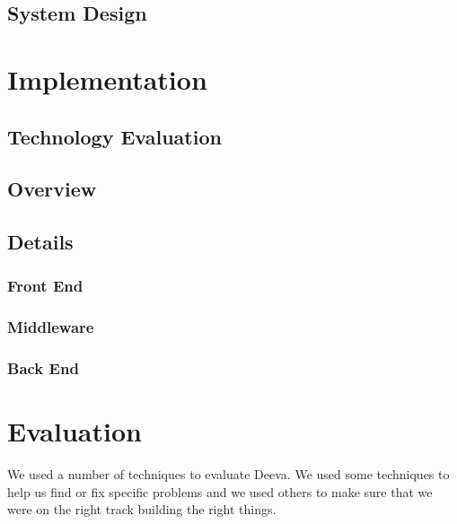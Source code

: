 \documentclass[11pt, a4paper]{article}
\begin{document}
\subsection{System Design}

\section{Implementation}
\subsection{Technology Evaluation}
\subsection{Overview}
\subsection{Details}
\subsubsection{Front End}
\subsubsection{Middleware}
\subsubsection{Back End}

\section{Evaluation}
We used a number of techniques to evaluate Deeva.
We used some techniques to help us find or fix specific problems and we used others to make sure that we were on the right track building the right things.
\end{document}
